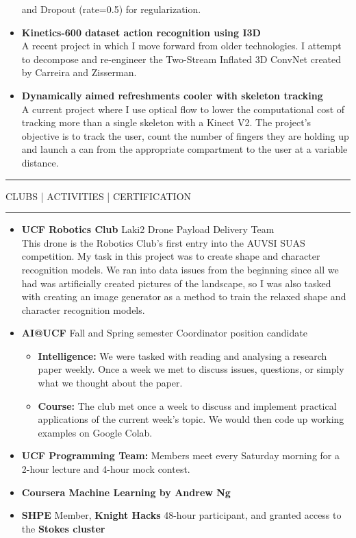 \documentclass{article}
\newcommand{\makesection}[1]{\hrule\vskip1mm\uppercase{#1}\vskip1mm\hrule}
\begin{document}
\begin{itemize}[leftmargin=.35cm]
        and Dropout (rate=0.5) for regularization.
        \item \textbf{Kinetics-600 dataset action recognition using I3D} \\
        A recent project in which I move forward from older technologies. I attempt to
        decompose and re-engineer the Two-Stream Inflated 3D ConvNet created by Carreira
        and Zisserman.
        \item \textbf{Dynamically aimed refreshments cooler with skeleton tracking} \\
        A current project where I use optical flow to lower the computational cost of tracking
        more than a single skeleton with a Kinect V2. The project's objective is to track the
        user, count the number of fingers they are holding up and launch a can from the
        appropriate compartment to the user at a variable distance.

    \end{itemize}
    \makesection{Clubs | Activities | Certification}
    \begin{itemize}[leftmargin=.35cm]
        \item \textbf{UCF Robotics Club} Laki2 Drone Payload Delivery Team \\
        This drone is the Robotics Club's first entry into the AUVSI SUAS competition. My task
        in this project was to create shape and character recognition models. We ran into data
        issues from the beginning since all we had was artificially created pictures of the
        landscape, so I was also tasked with creating an image generator as a method to train
        the relaxed shape and character recognition models.
        \item \textbf{AI@UCF} Fall and Spring semester Coordinator position candidate
        \vspace*{-.05cm}
        \begin{itemize}[$\circ$]
            \item \textbf{Intelligence:} We were tasked with reading and analysing a research
            paper weekly. Once a week we met to discuss issues, questions, or simply what we
            thought about the paper.
            \item \textbf{Course:} The club met once a week to discuss and implement practical
            applications of the current week's topic. We would then code up working examples on
            Google Colab.
        \end{itemize}
        \item \textbf{UCF Programming Team:} Members meet every Saturday morning for a 2-hour lecture
        and 4-hour mock contest.
        \item \textbf{Coursera Machine Learning by Andrew Ng}
        \item \textbf{SHPE} Member, \textbf{Knight Hacks} 48-hour participant, and granted access to the \textbf{Stokes cluster}
    \end{itemize}
        
\end{document}
